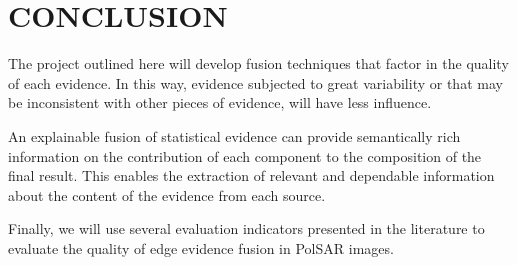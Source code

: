 \documentclass{article}
\begin{document}
 \vspace{-0.2cm}
\section{CONCLUSION}
\vspace{-0.2cm}
The project outlined here will develop fusion techniques that factor in the quality of each evidence. In this way, evidence subjected to great variability or that may be inconsistent with other pieces of evidence, will have less influence.

An explainable fusion of statistical evidence can provide semantically rich information on the contribution of each component to the composition of the final result. 
This enables the extraction of relevant and dependable information about the content of the evidence from each source. 

Finally, we will use several evaluation indicators presented in the literature to evaluate the quality of edge evidence fusion in PolSAR images.



\newpage












\end{document}
